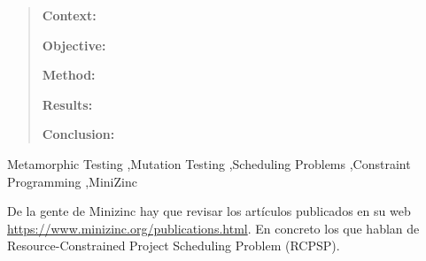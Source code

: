 \begin{frontmatter}




\begin{abstract}

  \textbf{Context:} 
  
  \textbf{Objective:} 

  \textbf{Method:} 

  \textbf{Results:} 

  \textbf{Conclusion:}

\end{abstract}



\begin{keyword}
 Metamorphic Testing \sep Mutation Testing \sep Scheduling Problems \sep Constraint Programming \sep MiniZinc
\end{keyword}

\end{frontmatter}





De la gente de Minizinc hay que revisar los artículos publicados en su web \url{https://www.minizinc.org/publications.html}. En concreto los que hablan de Resource-Constrained Project Scheduling Problem (RCPSP).

